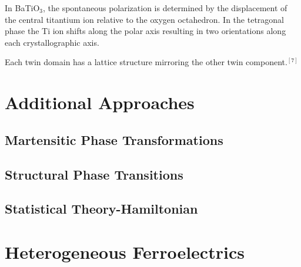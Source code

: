 \documentclass{article}
\begin{document}
In BaTiO$_3$, the spontaneous polarization is determined by the displacement of the central titantium ion relative to the oxygen octahedron.  In the tetragonal phase the Ti ion shifts along the polar axis resulting in two orientations along each crystallographic axis.

Each twin domain has a lattice structure mirroring the other twin component.$^{ [7]}$

\section{Additional Approaches}
\subsection{Martensitic Phase Transformations}
\subsection{Structural Phase Transitions}
\subsection{Statistical Theory-Hamiltonian}
\section{Heterogeneous Ferroelectrics}



















	
\end{document}
